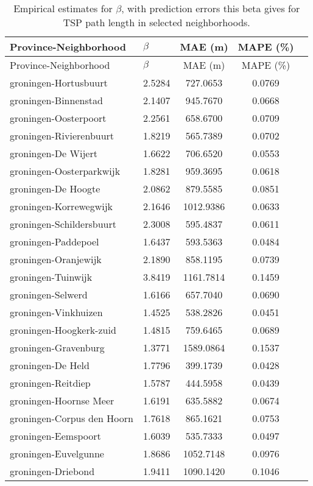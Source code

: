 \begin{longtable}{llccc}
\caption{Empirical estimates for $\beta$, with prediction errors this beta gives for TSP path length in selected neighborhoods.} \label{tab:results}\\
\hline
Province-Neighborhood & $\beta$ & MAE (m) & MAPE (\%) \\
\hline
\endfirsthead
\hline
Province-Neighborhood & $\beta$ & MAE (m) & MAPE (\%) \\
\hline
\endhead
groningen-Hortusbuurt & 2.5284 & 727.0653 & 0.0769 \\
groningen-Binnenstad & 2.1407 & 945.7670 & 0.0668 \\
groningen-Oosterpoort & 2.2561 & 658.6700 & 0.0709 \\
groningen-Rivierenbuurt & 1.8219 & 565.7389 & 0.0702 \\
groningen-De Wijert & 1.6622 & 706.6520 & 0.0553 \\
groningen-Oosterparkwijk & 1.8281 & 959.3695 & 0.0618 \\
groningen-De Hoogte & 2.0862 & 879.5585 & 0.0851 \\
groningen-Korrewegwijk & 2.1646 & 1012.9386 & 0.0633 \\
groningen-Schildersbuurt & 2.3008 & 595.4837 & 0.0611 \\
groningen-Paddepoel & 1.6437 & 593.5363 & 0.0484 \\
groningen-Oranjewijk & 2.1890 & 858.1195 & 0.0739 \\
groningen-Tuinwijk & 3.8419 & 1161.7814 & 0.1459 \\
groningen-Selwerd & 1.6166 & 657.7040 & 0.0690 \\
groningen-Vinkhuizen & 1.4525 & 538.2826 & 0.0451 \\
groningen-Hoogkerk-zuid & 1.4815 & 759.6465 & 0.0689 \\
groningen-Gravenburg & 1.3771 & 1589.0864 & 0.1537 \\
groningen-De Held & 1.7796 & 399.1739 & 0.0428 \\
groningen-Reitdiep & 1.5787 & 444.5958 & 0.0439 \\
groningen-Hoornse Meer & 1.6191 & 635.5882 & 0.0674 \\
groningen-Corpus den Hoorn & 1.7618 & 865.1621 & 0.0753 \\
groningen-Eemspoort & 1.6039 & 535.7333 & 0.0497 \\
groningen-Euvelgunne & 1.8686 & 1052.7148 & 0.0976 \\
groningen-Driebond & 1.9411 & 1090.1420 & 0.1046 \\

\end{longtable}
